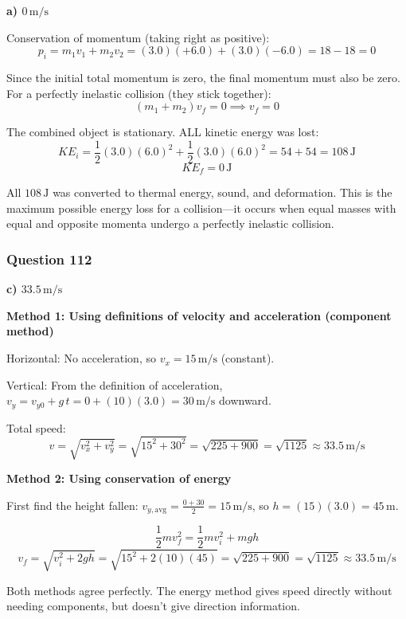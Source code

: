 \documentclass[12pt,letterpaper]{article}
\begin{document}
\begin{answerbox}
\textbf{a) $0\,\text{m/s}$}
\end{answerbox}

\begin{explanationbox}
Conservation of momentum (taking right as positive):
\[
p_i = m_1 v_1 + m_2 v_2 = (3.0)(+6.0) + (3.0)(-6.0) = 18 - 18 = 0
\]

Since the initial total momentum is zero, the final momentum must also be zero. For a perfectly inelastic collision (they stick together):
\[
(m_1 + m_2)v_f = 0 \implies v_f = 0
\]

The combined object is stationary. ALL kinetic energy was lost:
\[
KE_i = \frac{1}{2}(3.0)(6.0)^2 + \frac{1}{2}(3.0)(6.0)^2 = 54 + 54 = 108\,\text{J}
\]
\[
KE_f = 0\,\text{J}
\]

All $108\,\text{J}$ was converted to thermal energy, sound, and deformation. This is the maximum possible energy loss for a collision---it occurs when equal masses with equal and opposite momenta undergo a perfectly inelastic collision.
\end{explanationbox}

\subsubsection*{Question 112}

\begin{answerbox}
\textbf{c) $33.5\,\text{m/s}$}
\end{answerbox}

\begin{explanationbox}
\textbf{Method 1: Using definitions of velocity and acceleration (component method)}

Horizontal: No acceleration, so $v_x = 15\,\text{m/s}$ (constant).

Vertical: From the definition of acceleration, $v_y = v_{y0} + g\,t = 0 + (10)(3.0) = 30\,\text{m/s}$ downward.

Total speed:
\[
v = \sqrt{v_x^2 + v_y^2} = \sqrt{15^2 + 30^2} = \sqrt{225 + 900} = \sqrt{1125} \approx 33.5\,\text{m/s}
\]

\textbf{Method 2: Using conservation of energy}

First find the height fallen: $v_{y,\text{avg}} = \frac{0 + 30}{2} = 15\,\text{m/s}$, so $h = (15)(3.0) = 45\,\text{m}$.

\[
\frac{1}{2}mv_f^2 = \frac{1}{2}mv_i^2 + mgh
\]
\[
v_f = \sqrt{v_i^2 + 2gh} = \sqrt{15^2 + 2(10)(45)} = \sqrt{225 + 900} = \sqrt{1125} \approx 33.5\,\text{m/s}
\]

Both methods agree perfectly. The energy method gives speed directly without needing components, but doesn't give direction information.
\end{explanationbox}
\end{document}
